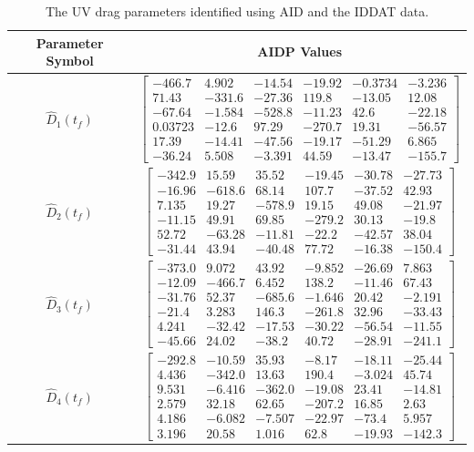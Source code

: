 \begin{table}[htbp]
\ssp
\caption{The \ac{UV} drag parameters identified using \ac{AID} and the
  \ac{IDDAT} data.}
\begin{center}
\begin{tabular}{c|c}
Parameter Symbol & \ac{AIDP} Values \\ \hline
$\hat{D}_1(t_f)$ & $ \left[\begin{array}{cccccc} -466.7 & 4.902 & -14.54 & -19.92 & -0.3734 & -3.236\\ 71.43 & -331.6 & -27.36 & 119.8 & -13.05 & 12.08\\ -67.64 & -1.584 & -528.8 & -11.23 & 42.6 & -22.18\\ 0.03723 & -12.6 & 97.29 & -270.7 & 19.31 & -56.57\\ 17.39 & -14.41 & -47.56 & -19.17 & -51.29 & 6.865\\ -36.24 & 5.508 & -3.391 & 44.59 & -13.47 & -155.7 \end{array}\right] $ \\ 
$\hat{D}_2(t_f)$ & $ \left[\begin{array}{cccccc} -342.9 & 15.59 & 35.52 & -19.45 & -30.78 & -27.73\\ -16.96 & -618.6 & 68.14 & 107.7 & -37.52 & 42.93\\ 7.135 & 19.27 & -578.9 & 19.15 & 49.08 & -21.97\\ -11.15 & 49.91 & 69.85 & -279.2 & 30.13 & -19.8\\ 52.72 & -63.28 & -11.81 & -22.2 & -42.57 & 38.04\\ -31.44 & 43.94 & -40.48 & 77.72 & -16.38 & -150.4 \end{array}\right] $ \\ 
$\hat{D}_3(t_f)$ & $ \left[\begin{array}{cccccc} -373.0 & 9.072 & 43.92 & -9.852 & -26.69 & 7.863\\ -12.09 & -466.7 & 6.452 & 138.2 & -11.46 & 67.43\\ -31.76 & 52.37 & -685.6 & -1.646 & 20.42 & -2.191\\ -21.4 & 3.283 & 146.3 & -261.8 & 32.96 & -33.43\\ 4.241 & -32.42 & -17.53 & -30.22 & -56.54 & -11.55\\ -45.66 & 24.02 & -38.2 & 40.72 & -28.91 & -241.1 \end{array}\right] $ \\ 
$\hat{D}_4(t_f)$ & $ \left[\begin{array}{cccccc} -292.8 & -10.59 & 35.93 & -8.17 & -18.11 & -25.44\\ 4.436 & -342.0 & 13.63 & 190.4 & -3.024 & 45.74\\ 9.531 & -6.416 & -362.0 & -19.08 & 23.41 & -14.81\\ 2.579 & 32.18 & 62.65 & -207.2 & 16.85 & 2.63\\ 4.186 & -6.082 & -7.507 & -22.97 & -73.4 & 5.957\\ 3.196 & 20.58 & 1.016 & 62.8 & -19.93 & -142.3 \end{array}\right] $ \\ 

\end{tabular}
\end{center}
\end{table}
